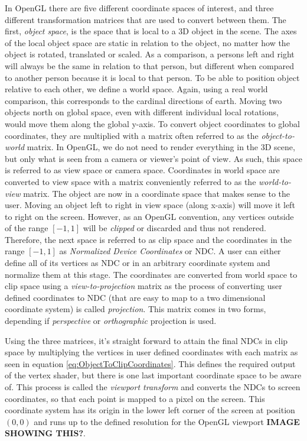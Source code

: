 In OpenGL there are five different coordinate spaces of interest, and three different transformation matrices that are used to convert between them. The first, \textit{object space}, is the space that is local to a 3D object in the scene. The axes of the local object space are static in relation to the object, no matter how the object is rotated, translated or scaled. As a comparison, a persons left and right will always be the same in relation to that person, but different when compared to another person because it is local to that person. To be able to position object relative to each other, we define a world space. Again, using a real world comparison, this corresponds to the cardinal directions of earth. Moving two objects north on global space, even with different individual local rotations, would move them along the global y-axis. To convert object coordinates to global coordinates, they are multiplied with a matrix often referred to as the \textit{object-to-world} matrix. In OpenGL, we do not need to render everything in the 3D scene, but only what is seen from a camera or viewer's point of view. As such, this space is referred to as view space or camera space. Coordinates in world space are converted to view space with a matrix conveniently referred to as the \textit{world-to-view} matrix. The object are now in a coordinate space that makes sense to the user. Moving an object left to right in view space (along x-axis) will move it left to right on the screen. However, as an OpenGL convention, any vertices outside of the range $[-1,1]$ will be \textit{clipped} or discarded and thus not rendered. Therefore, the next space is referred to as clip space and the coordinates in the range $[-1,1]$ as \textit{Normalized Device Coordinates} or NDC. A user can either define all of its vertices as NDC or in an arbitrary coordinate system and normalize them at this stage. The coordinates are converted from world space to clip space using a \textit{view-to-projection} matrix as the process of converting user defined coordinates to NDC (that are easy to map to a two dimensional coordinate system) is called \textit{projection}. This matrix comes in two forms, depending if \textit{perspective} or \textit{orthographic} projection is used.

Using the three matrices, it's straight forward to attain the final NDCs in clip space by multiplying the vertices in user defined coordinates with each matrix as seen in equation \ref{eq:ObjectToClipCoordinates}. This defines the required output of the vertex shader, but there is one last important coordinate space to be aware of. This process is called the \textit{viewport transform} and converts the NDCs to screen coordinates, so that each point is mapped to a pixel on the screen. This coordinate system has its origin in the lower left corner of the screen at position $(0,0)$ and runs up to the defined resolution for the OpenGL viewport \textbf{IMAGE SHOWING THIS?}.

